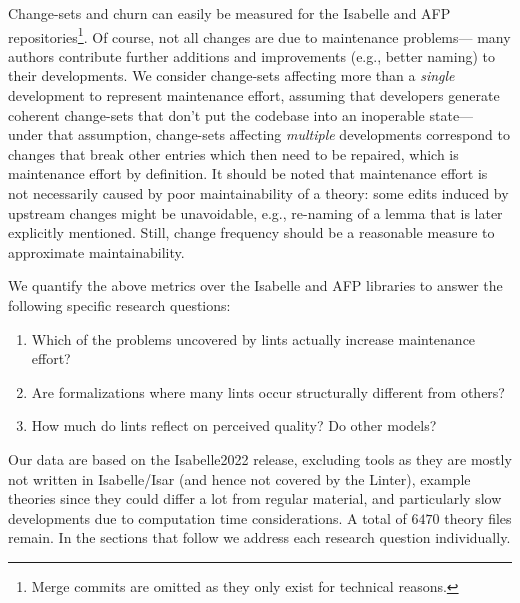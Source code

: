 Change-sets and churn can easily be measured for the Isabelle and AFP repositories\footnote{Merge commits are omitted as they only exist for technical reasons.}.
Of course, not all changes are due to maintenance problems---%
many authors contribute further additions and improvements
(e.g., better naming) to their developments.
We consider change-sets affecting more than a \emph{single} development to represent maintenance effort,
assuming that developers generate coherent change-sets that don't put the codebase into an inoperable state---%
under that assumption,
change-sets affecting \emph{multiple} developments correspond to changes that break other entries which then need to be repaired,
which is maintenance effort by definition.
It should be noted that maintenance effort is not necessarily caused by poor maintainability of a theory:
some edits induced by upstream changes might be unavoidable,
e.g., re-naming of a lemma that is later explicitly mentioned.
Still, change frequency should be a reasonable measure to approximate maintainability.

We quantify the above metrics over the Isabelle and AFP libraries to answer the following specific research questions:
\begin{enumerate}[label=\bfseries{RQ\arabic*}:, leftmargin=*]
\item Which of the problems uncovered by lints actually increase maintenance effort?
\item Are formalizations where many lints occur structurally different from others?
\item How much do lints reflect on perceived quality? Do other models?
\end{enumerate}

Our data are based on the Isabelle2022 release,
excluding tools as they are mostly not written in Isabelle/Isar
(and hence not covered by the Linter),
example theories since they could differ a lot from regular material,
and particularly slow developments due to computation time considerations.
A total of $6470$ theory files remain.
In the sections that follow we address each research question individually.

